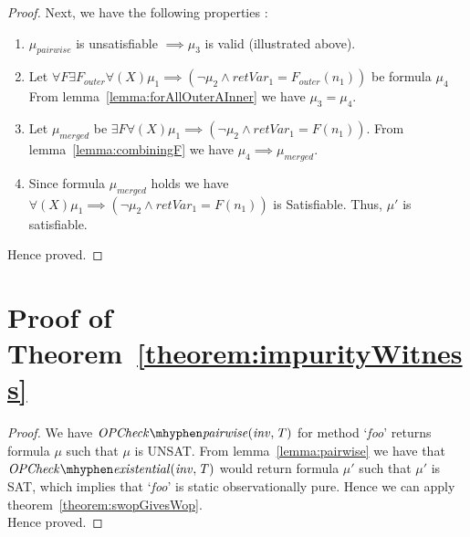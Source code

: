 \documentclass{llncs}
\newcommand{\foo}{\textit{foo}}
\newcommand{\inv}{\mathit{inv}}
\newcommand{\OPCheckE}{\mathit{OPCheck \mhyphen existential}}
\newcommand{\OPCheckA}{\mathit{OPCheck \mhyphen pairwise}}
\newcommand{\mi}[1]{\mathit{#1}}
\newcommand{\retVar}{\textit{retVar}}
\newcommand{\F}{\mathit{F}}
\newcommand{\n}{\textit{n}}
\newcommand{\formula}{\mu}
\begin{document}
\begin{subappendices}
\begin{proof}
  Next, we have the following properties :
  \begin{enumerate}
  \item $\formula_{pairwise}$ is unsatisfiable $\implies \formula_3$
    is valid (illustrated above). 
  \item Let $\forall \F \exists \F_{outer} \forall (X) \formula_1
  \implies (\neg \formula_2 \wedge \retVar_1 = \F_{outer}(\n_1))$ be
  formula $\formula_4$
    From lemma~\ref{lemma:forAllOuterAInner} we have $\formula_3 =
    \formula_4$.
  \item Let $\formula_{merged}$ be $\exists \F \forall (X) \formula_1
    \implies (\neg \formula_2 \wedge \retVar_1 = \F(\n_1))$. From
    lemma~\ref{lemma:combiningF} we have $\formula_4 \implies
    \formula_{merged}$. 
  \item Since formula $\formula_{merged}$ holds we have $\forall (X) \formula_1
    \implies (\neg \formula_2 \wedge \retVar_1 = \F(\n_1))$ is
    Satisfiable. Thus, $\formula'$ is satisfiable.
  \end{enumerate}
Hence proved.
\end{proof}

\section{Proof of Theorem~\ref{theorem:impurityWitness}}

\begin{proof}
  We have $\OPCheckA \mi{(\inv, T)}$ for method `\foo' returns formula
  $\formula$ such that $\formula$ is UNSAT. From
  lemma~\ref{lemma:pairwise} we have that $\OPCheckE \mi{(\inv, T)}$
  would return formula $\formula'$ such that $\formula'$ is SAT, which
  implies that `\foo' is static observationally pure. Hence we
  can apply theorem~\ref{theorem:swopGivesWop}.\\
  Hence proved.
\end{proof}

\end{subappendices}

%

%
%





\end{document}
